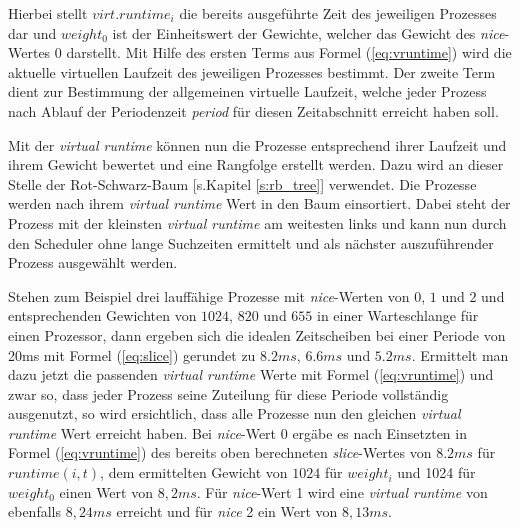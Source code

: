 Hierbei stellt $virt. runtime_{i}$ die bereits ausgeführte Zeit des jeweiligen Prozesses dar und \textit{$weight_{0}$} ist der Einheitswert der Gewichte, welcher das Gewicht des \textit{nice}-Wertes 0 darstellt.  
Mit Hilfe des ersten Terms aus Formel (\ref{eq:vruntime}) wird die aktuelle virtuellen Laufzeit des jeweiligen Prozesses bestimmt. Der zweite Term dient zur Bestimmung der allgemeinen virtuelle Laufzeit, welche jeder Prozess nach Ablauf der Periodenzeit \textit{period} für diesen Zeitabschnitt erreicht haben soll. 

Mit der \textit{virtual runtime} können nun die Prozesse entsprechend ihrer Laufzeit und ihrem Gewicht bewertet und eine Rangfolge erstellt werden. Dazu wird an dieser Stelle der Rot-Schwarz-Baum [s.Kapitel \ref{s:rb_tree}] verwendet. Die Prozesse werden nach ihrem \textit{virtual runtime} Wert in den Baum einsortiert. Dabei steht der Prozess mit der kleinsten \textit{virtual runtime} am weitesten links und kann nun durch den Scheduler ohne lange Suchzeiten ermittelt und als nächster auszuführender Prozess ausgewählt werden. 

Stehen zum Beispiel drei lauffähige Prozesse  mit \textit{nice}-Werten von  $0$, $1$ und $2$ und entsprechenden Gewichten von $1024$, $820$ und $655$ in einer Warteschlange für einen Prozessor, dann ergeben sich die idealen Zeitscheiben bei einer Periode von 20ms mit Formel (\ref{eq:slice}) gerundet zu $8.2ms$, $6.6ms$ und $5.2ms$.
Ermittelt man dazu jetzt die passenden \textit{virtual runtime} Werte mit Formel (\ref{eq:vruntime}) und zwar so, dass jeder Prozess seine Zuteilung für diese Periode vollständig ausgenutzt, so wird ersichtlich, dass alle Prozesse nun den gleichen \textit{virtual runtime} Wert erreicht haben.
Bei \textit{nice}-Wert 0 ergäbe es nach Einsetzten in Formel (\ref{eq:vruntime}) des bereits oben berechneten \textit{slice}-Wertes von $8.2ms$ für  $runtime(i,t)$, dem ermittelten Gewicht von $1024$ für $weight_{i}$ und 1024 für $weight_{0}$ einen Wert von $8,2ms$.
Für \textit{nice}-Wert 1 wird eine \textit{virtual runtime} von ebenfalls $8,24ms$ erreicht und für \textit{nice} 2 ein Wert von $8,13ms$. 

